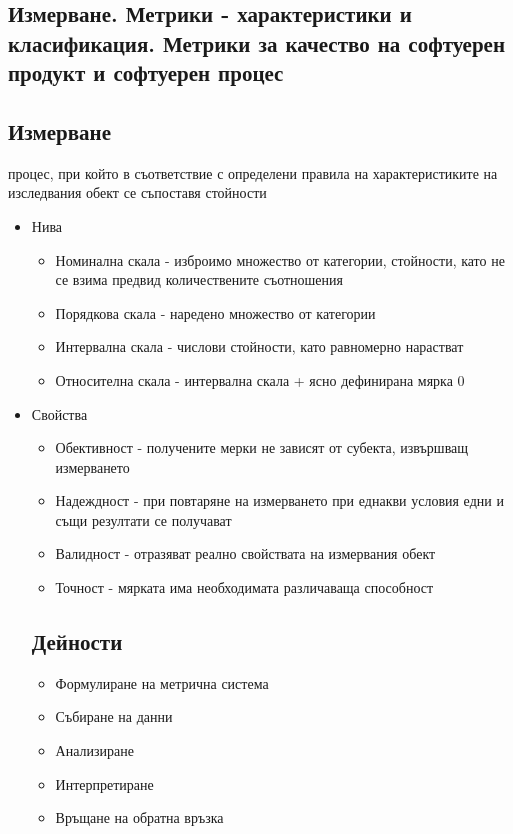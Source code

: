 \documentclass[fleqn,12pt]{article}
\begin{document}
\begin{flushleft}
\section{Измерване. Метрики - характеристики и класификация. Метрики за качество на софтуерен продукт и софтуерен процес}
    \subsection{Измерване}
    процес, при който в съответствие с определени правила на характеристиките на изследвания обект се съпоставя стойности
        \begin{itemize}
            \item Нива
                \begin{itemize}
                    \item Номинална скала - изброимо множество от категории, стойности, като не се взима предвид количествените съотношения
                    \item Порядкова скала - наредено множество от категории
                    \item Интервална скала - числови стойности, като равномерно нарастват
                    \item Относителна скала - интервална скала + ясно дефинирана мярка 0
                \end{itemize}
            \item Свойства
                \begin{itemize}
                    \item Обективност - получените мерки не зависят от субекта, извършващ измерването
            \item Надеждност - при повтаряне на измерването при еднакви условия едни и същи резултати се получават
            \item Валидност - отразяват реално свойствата на измервания обект
            \item Точност - мярката има необходимата различаваща способност
        \end{itemize}
  \subsection{Дейности}
    \begin{itemize}
        \item Формулиране на метрична система
        \item Събиране на данни
        \item Анализиране
        \item Интерпретиране
        \item Връщане на обратна връзка
    \end{itemize}

\end{itemize}
\end{flushleft}
\end{document}

